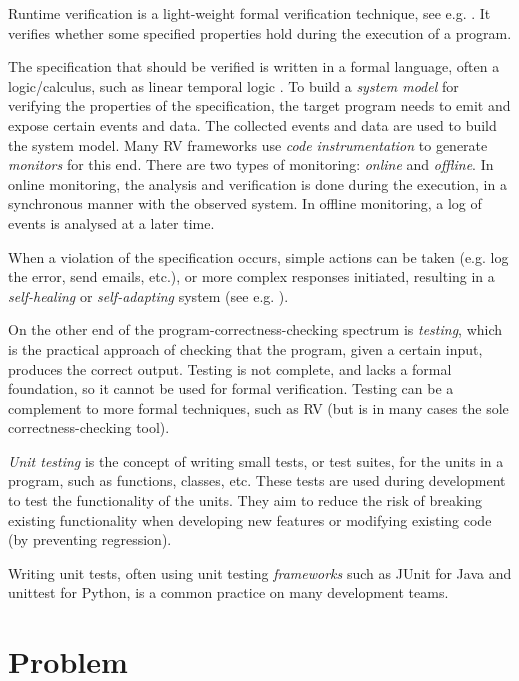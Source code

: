 \documentclass[a4paper,11pt]{article}
\begin{document}
Runtime verification is a light-weight formal verification technique, see e.g. \cite{leucker08,delgado04}.
It verifies whether some specified properties hold during the execution of a
program.

The specification that should be verified is written in a formal
language, often a logic/calculus, such as linear temporal logic
\cite{pnueli77}. To build
a \emph{system model} for verifying the properties of the specification, the target program
needs to emit and expose certain events and data. The collected events and data are used to build the system model. Many RV frameworks use \textit{code instrumentation}
to generate \textit{monitors} for this end. There are two types of monitoring:
\emph{online} and \emph{offline}.
In online monitoring, the analysis and verification is done during the execution, in a synchronous
manner with the observed system. In offline monitoring, a log of events is analysed at a later time.

When a violation of the specification occurs, simple actions can be taken (e.g. log the error, send emails, etc.), or more complex responses initiated, resulting in a \textit{self-healing} or \textit{self-adapting} system (see e.g. \cite{huebscher08}).

On the other end of the program-correctness-checking spectrum is \emph{testing}, which is the
practical approach of checking that the program, given a certain input, produces the correct output.
Testing is not complete, and lacks a formal foundation, so it cannot be used for formal verification. 
Testing can be a complement to more formal techniques, such as RV (but is in many cases the sole correctness-checking tool).

\textit{Unit testing} is the concept of writing small tests, or test suites, for the units in
a program, such as functions, classes, etc. These tests are used during development to test the 
functionality of the units. They aim to reduce the risk of breaking existing functionality when 
developing new features or modifying existing code (by preventing regression).

Writing unit tests, often using unit testing \textit{frameworks} such as JUnit \cite{junit}
for Java and unittest \cite{python-unittest} for Python, is a common practice on many
development teams.


\section{Problem}
\end{document}
